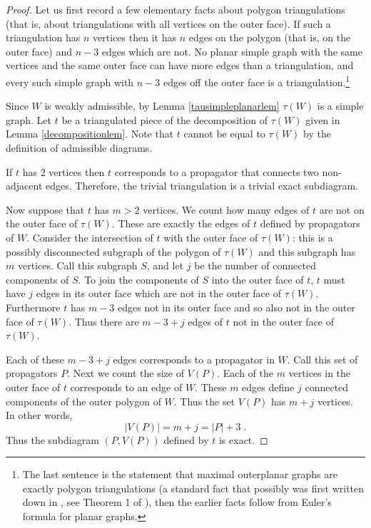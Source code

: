 \documentclass[11pt]{article}
\theoremstyle{remark}
\theoremstyle{definition}
\begin{document}
\begin{proof}
Let us first record a few elementary facts about polygon triangulations (that is, about triangulations with all vertices on the outer face).  If such a triangulation has $n$ vertices then it has $n$ edges on the polygon (that is, on the outer face) and $n-3$ edges which are not.  No planar simple graph with the same vertices and the same outer face can have more edges than a triangulation, and every such simple graph with $n-3$ edges off the outer face is a triangulation.\footnote{The last sentence is the statement that maximal outerplanar graphs are exactly polygon triangulations (a standard fact that possibly was first written down in \cite{MPhD}, see Theorem 1 of \cite{LMN}), then the earlier facts follow from Euler's formula for planar graphs.}

Since $W$ is weakly admissible, by Lemma \ref{tausimpleplanarlem} $\tau(W)$ is a simple graph. Let $t$ be a triangulated piece of the decomposition of $\tau(W)$ given in Lemma \ref{decompositionlem}.  Note that $t$ cannot be equal to $\tau(W)$ by the definition of admissible diagrams.

If $t$ has 2 vertices then $t$ corresponds to a propagator that connects two non-adjacent edges. Therefore, the trivial triangulation is a trivial exact subdiagram.

Now suppose that $t$ has $m>2$ vertices.  We count how many edges of $t$ are not on the outer face of $\tau(W)$.  These are exactly the edges of $t$ defined by propagators of $W$. Consider the intersection of $t$ with the outer face of $\tau(W)$: this is a possibly disconnected subgraph of the polygon of $\tau(W)$ and this subgraph has $m$ vertices. Call this subgraph $S$, and let $j$ be the number of connected components of $S$.   To join the components of $S$ into the outer face of $t$, $t$ must have $j$ edges in its outer face which are not in the outer face of $\tau(W)$.  Furthermore $t$ has $m-3$ edges not in its outer face and so also not in the outer face of $\tau(W)$.  Thus there are $m-3+j$ edges of $t$ not in the outer face of $\tau(W)$.

Each of these $m-3+j$ edges corresponds to a propagator in $W$.  Call this set of propagators $P$.  Next we count the size of $V(P)$.  Each of the $m$ vertices in the outer face of $t$ corresponds to an edge of $W$. These $m$ edges define $j$ connected components of the outer polygon of $W$. Thus the set $V(P)$ has $m+j$ vertices.  In other words, 
\[|V(P)| = m+j = |P| +3\;.\]
Thus the subdiagram $(P,V(P))$ defined by $t$ is exact.



\end{proof}
\end{document}
